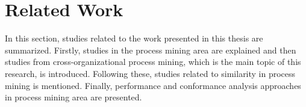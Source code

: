 \section{Related Work}
\label{sec:relatedwork}

In this section, studies related to the work presented in this thesis are summarized. Firstly, studies in the process mining area are explained and then studies from cross-organizational process mining, which is the main topic of this research, is introduced. Following these, studies related to similarity in process mining is mentioned. Finally, performance and conformance analysis approaches in process mining area are presented.